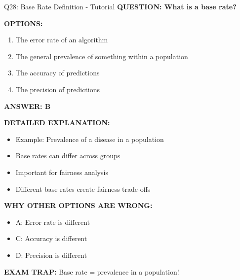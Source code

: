 \documentclass[8pt]{beamer}
\begin{document}
	\begin{frame}{Q28: Base Rate Definition - Tutorial}
		\fontsize{6.5}{7.5}\selectfont
		\textbf{QUESTION: What is a base rate?}
		
		\vspace{0.1cm}
		\textbf{OPTIONS:}
		\begin{enumerate}
			\item The error rate of an algorithm
			\item The general prevalence of something within a population
			\item The accuracy of predictions
			\item The precision of predictions
		\end{enumerate}
		
		\vspace{0.1cm}
		\textcolor{myblue}{\textbf{ANSWER: B}}
		
		\vspace{0.1cm}
		\textbf{DETAILED EXPLANATION:}
		\begin{itemize}
			\item Example: Prevalence of a disease in a population
			\item Base rates can differ across groups
			\item Important for fairness analysis
			\item Different base rates create fairness trade-offs
		\end{itemize}
		
		\vspace{0.1cm}
		\textcolor{myred}{\textbf{WHY OTHER OPTIONS ARE WRONG:}}
		\begin{itemize}
			\item \textcolor{myred}{A:} Error rate is different
			\item \textcolor{myred}{C:} Accuracy is different
			\item \textcolor{myred}{D:} Precision is different
		\end{itemize}
		
		\textcolor{myred}{\textbf{EXAM TRAP:}} Base rate = \textcolor{myblue}{prevalence in a population}!
	\end{frame}
	
\end{document}
